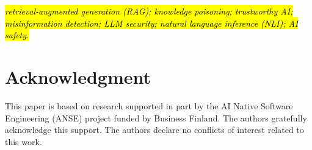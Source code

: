 \documentclass[conference]{IEEEtran}
\newcommand{\rev}[1]{\hl{#1}} %
\begin{document}
\begin{IEEEkeywords}
\rev{\itshape retrieval-augmented generation (RAG); knowledge poisoning; trustworthy AI; misinformation detection; LLM security; natural language inference (NLI); AI safety.}
\end{IEEEkeywords}








\section*{Acknowledgment}
This paper is based on research supported in part by the AI Native Software Engineering (ANSE) project funded by Business Finland. The authors gratefully acknowledge this support. The authors declare no conflicts of interest related to this work.


\end{document}
